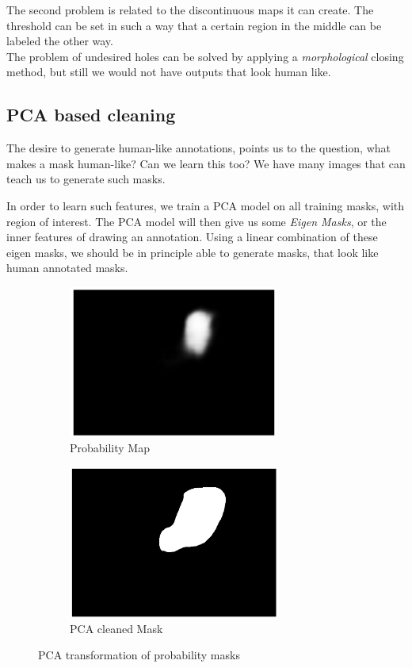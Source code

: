 \documentclass[12pt, a4paper]{article}
\begin{document}
The second problem is related to the discontinuous maps it can create. The threshold can be set in such a way that a certain region in the middle can be labeled the other way.
\\
The problem of undesired holes can be solved by applying a \emph{morphological} closing method, but still we would not have outputs that look human like.

\subsection{PCA based cleaning}
The desire to generate human-like annotations, points us to the question, what makes a mask human-like? Can we learn this too? We have many images that can teach us to generate such masks. 

In order to learn such features, we train a PCA model on all training masks, with region of interest. The PCA model will then give us some \emph{Eigen Masks}, or the inner features of drawing an annotation. Using a linear combination of these eigen masks, we should be in principle able to generate masks, that look like human annotated masks.
\begin{figure}[h] 
\begin{subfigure}{0.5\textwidth}
\includegraphics[width=\linewidth,height=5cm]{probability_mask.png} 
\caption{Probability Map}
\label{fig:probabilitymap}
\end{subfigure}
\begin{subfigure}{0.5\textwidth}
\includegraphics[width=\linewidth, height=5cm]{pca_cleaned.png}
\caption{PCA cleaned Mask}
\label{fig:pcamask}
\end{subfigure}
\caption{PCA transformation of probability masks}
\label{fig:pcatransform}
\end{figure}
\\
\end{document}
